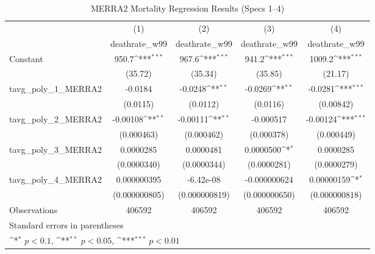 \begin{table}[htbp]\centering
\def\sym#1{\ifmmode^{#1}\else\(^{#1}\)\fi}
\caption{MERRA2 Mortality Regression Results (Specs 1–4)}
\begin{tabular}{l*{4}{c}}
\hline\hline
                    &\multicolumn{1}{c}{(1)}&\multicolumn{1}{c}{(2)}&\multicolumn{1}{c}{(3)}&\multicolumn{1}{c}{(4)}\\
                    &\multicolumn{1}{c}{deathrate\_w99}&\multicolumn{1}{c}{deathrate\_w99}&\multicolumn{1}{c}{deathrate\_w99}&\multicolumn{1}{c}{deathrate\_w99}\\
\hline
Constant            &       950.7\sym{***}&       967.6\sym{***}&       941.2\sym{***}&      1009.2\sym{***}\\
                    &     (35.72)         &     (35.34)         &     (35.85)         &     (21.17)         \\
[1em]
tavg\_poly\_1\_MERRA2  &     -0.0184         &     -0.0248\sym{**} &     -0.0269\sym{**} &     -0.0281\sym{***}\\
                    &    (0.0115)         &    (0.0112)         &    (0.0116)         &   (0.00842)         \\
[1em]
tavg\_poly\_2\_MERRA2  &    -0.00108\sym{**} &    -0.00111\sym{**} &   -0.000517         &    -0.00124\sym{***}\\
                    &  (0.000463)         &  (0.000462)         &  (0.000378)         &  (0.000449)         \\
[1em]
tavg\_poly\_3\_MERRA2  &   0.0000285         &   0.0000481         &   0.0000500\sym{*}  &   0.0000285         \\
                    & (0.0000340)         & (0.0000344)         & (0.0000281)         & (0.0000279)         \\
[1em]
tavg\_poly\_4\_MERRA2  & 0.000000395         &   -6.42e-08         &-0.000000624         &  0.00000159\sym{*}  \\
                    &(0.000000805)         &(0.000000819)         &(0.000000650)         &(0.000000818)         \\
\hline
Observations        &      406592         &      406592         &      406592         &      406592         \\
\hline\hline
\multicolumn{5}{l}{\footnotesize Standard errors in parentheses}\\
\multicolumn{5}{l}{\footnotesize \sym{*} \(p<0.1\), \sym{**} \(p<0.05\), \sym{***} \(p<0.01\)}\\
\end{tabular}
\end{table}
